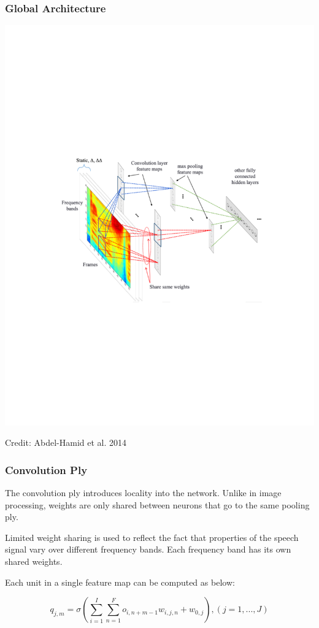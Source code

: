 \documentclass[notes]{beamer}
\begin{document}
\begin{frame}
	\frametitle{Global Architecture}
	\includegraphics[scale=0.65, trim=2cm 8cm 0 8cm, clip=true]{cnn-global.pdf}
	\begin{center}
		\tiny{Credit: Abdel-Hamid et al. 2014}
	\end{center}
\end{frame}

\begin{frame}
	\frametitle{Convolution Ply}
	\begin{center}
		The convolution ply introduces locality into the network. Unlike in image processing, weights are only shared between neurons that go to the same pooling ply. 
	\end{center}
	
	\begin{center}
		Limited weight sharing is used to reflect the fact that properties of the speech signal vary over different frequency bands. Each frequency band has its own shared weights.
	\end{center}	
	\vfill
	\begin{center}
		Each unit in a single feature map can be computed as below:
	\end{center}
	\begin{equation*}
	q_{j,m} = \sigma(\sum_{i=1}^{I}\sum_{n=1}^{F}o_{i,n+m-1}w_{i,j,n}+w_{0,j}), (j = 1, ..., J)
	\end{equation*}

\end{frame}
\end{document}
